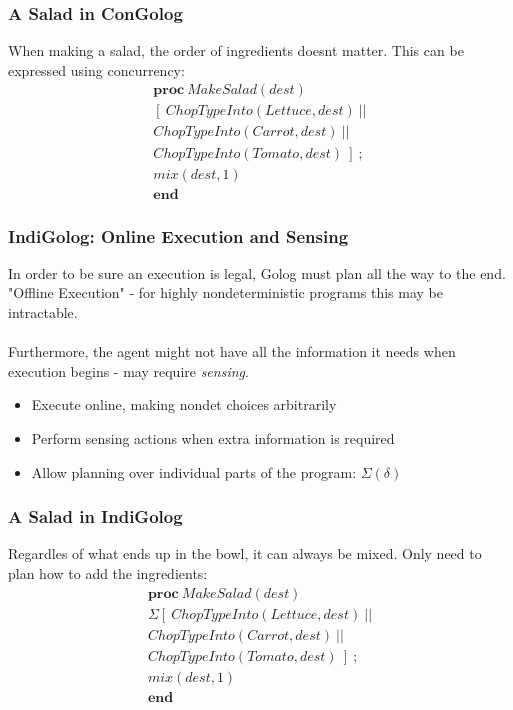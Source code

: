 \documentclass{beamer}
\begin{document}
\begin{frame}
\frametitle{A Salad in ConGolog}
When making a salad, the order of ingredients doesnt matter.  This can
be expressed using concurrency:\[
\begin{array}{c}
\mathbf{proc}\ MakeSalad(dest)\\
\left[\ ChopTypeInto(Lettuce,dest)\ ||\right.\\
ChopTypeInto(Carrot,dest)\ ||\\
\left.ChopTypeInto(Tomato,dest)\ \right]\ ;\\
mix(dest,1)\\
\mathbf{end}\end{array}\]
\end{frame}


\begin{frame}
\frametitle{IndiGolog: Online Execution and Sensing}
In order to be sure an execution is legal, Golog must plan all the way
to the end.  "Offline Execution" - for highly nondeterministic programs
this may be intractable.\\
\ \\
Furthermore, the agent might not have all the information it needs when
execution begins - may require \emph{sensing}.

\begin{itemize}
  \pause
  \item Execute online, making nondet choices arbitrarily
  \pause
  \item Perform sensing actions when extra information is required
  \pause
  \item Allow planning over individual parts of the program: $\Sigma(\delta)$
\end{itemize}
\end{frame}

\begin{frame}
\frametitle{A Salad in IndiGolog}
Regardles of what ends up in the bowl, it can always be mixed.  Only need
to plan how to add the ingredients:\[
\begin{array}{c}
\mathbf{proc}\ MakeSalad(dest)\\
\Sigma\left[\ ChopTypeInto(Lettuce,dest)\ ||\right.\\
ChopTypeInto(Carrot,dest)\ ||\\
\left.ChopTypeInto(Tomato,dest)\ \right]\ ;\\
mix(dest,1)\\
\mathbf{end}\end{array}\]
\end{frame}
\end{document}
